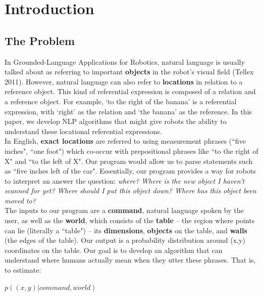 \documentclass[12pt,letterpaper]{article}
\newcommand\tab[1][1cm]{\hspace*{#1}}
\begin{document}
\section{Introduction}

\subsection{The Problem}

\tab In Grounded-Language Applications for Robotics, natural language is usually talked about as referring to important \textbf{objects} in the robot's visual field (Tellex 2011). However, natural language can also refer to \textbf{locations} in relation to a reference object. This kind of referential expression is composed of a relation and a reference object. For example, `to the right of the banana' is a referential expression, with `right' as the relation and `the banana' as the reference. In this paper, we develop NLP algorithms that might give robots the ability to understand these locational referential expressions.\\
\tab In English, \textbf{exact locations} are referred to using measurement phrases (``five inches", ``one foot") which co-occur with prepositional phrases like ``to the right of X" and ``to the left of X". Our program would allow us to parse statements such as ``five inches left of the car". Essentially, our program provides a way for robots to interpret an answer the question: \textit{where? Where is the new object I haven't scanned for yet? Where should I put this object down? Where has this object been moved to?}\\
\tab The inputs to our program are a \textbf{command}, natural language spoken by the user, as well as the \textbf{world}, which consists of the \textbf{table} \--- the region where points can lie (literally a ``table") \--- its \textbf{dimensions}, \textbf{objects} on the table, and \textbf{walls} (the edges of the table). Our output is a probability distribution around (x,y) coordinates on the table. Our goal is to develop an algorithm that can understand where humans actually mean when they utter these phrases. That is, to estimate:

\begin{center}
$p((x,y) | command, world)$
\end{center}
\end{document}
